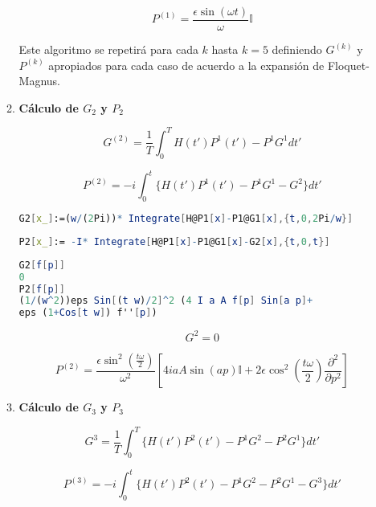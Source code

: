\begin{itemize}
\begin{enumerate}
\begin{equation}
    P^{(1)}=\frac{\epsilon\sin(\omega t)}{\omega}\mathbb{I}
\end{equation}

Este algoritmo se repetirá para cada $k$ hasta $k=5$ definiendo $G^{(k)}$ y $P^{(k)}$ apropiados para cada caso de acuerdo a la expansión de Floquet-Magnus.

\item \textbf{Cálculo de $G_2$ y $P_2$}

\begin{equation}
    G^{(2)}=\frac{1}{T}\int^{T}_{0} H(t')P^{1}(t')- P^{1}G^{1}dt'
\end{equation}

\begin{equation}
    P^{(2)}=-i\int^{t}_{0}\{ H(t')P^{1}(t')- P^{1}G^{1}-G^{2}\}dt'
\end{equation}

\begin{lstlisting}[language=Mathematica]
G2[x_]:=(w/(2Pi))* Integrate[H@P1[x]-P1@G1[x],{t,0,2Pi/w}]
\end{lstlisting}

\begin{lstlisting}[language=Mathematica]
P2[x_]:= -I* Integrate[H@P1[x]-P1@G1[x]-G2[x],{t,0,t}]
\end{lstlisting}



\begin{lstlisting}[language=Mathematica]
G2[f[p]]
0
P2[f[p]]
(1/(w^2))eps Sin[(t w)/2]^2 (4 I a A f[p] Sin[a p]+
eps (1+Cos[t w]) f''[p])
\end{lstlisting}

\begin{equation}
    G^{2}=0
\end{equation}

\begin{equation}
    P^{(2)}=\frac{\epsilon\sin^2(\frac{t\omega}{2})}{\omega^2}[4iaA\sin(ap)\mathbb{I}+2\epsilon\cos^2(\frac{t\omega}{2})\frac{\partial^2}{\partial p^2}]
\end{equation}

\item \textbf{Cálculo de $G_3$ y $P_3$}

\begin{equation}
    G^{3}=\frac{1}{T}\int^{T}_{0}\{ H(t')P^{2}(t')- P^{1}G^{2}-P^{2}G^{1}\}dt'
\end{equation}

\begin{equation}
    P^{(3)}=-i\int^{t}_{0}\{ H(t')P^{2}(t')- P^{1}G^{2}-P^{2}G^{1}-G^{3}\}dt'
\end{equation}


\end{enumerate}
\end{itemize}
